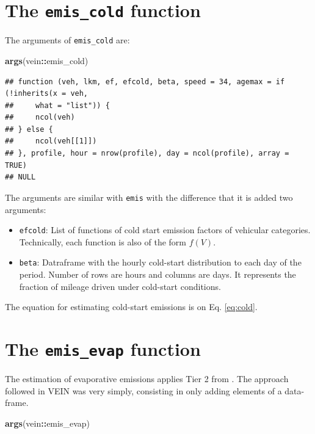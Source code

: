 \documentclass[12pt,graybox,envcountchap,sectrefs]{krantz}
\makeatletter
\newenvironment{Shaded}{\begin{snugshade}}{\end{snugshade}}
\newcommand{\KeywordTok}[1]{\textcolor[rgb]{0.13,0.29,0.53}{\textbf{#1}}}
\newcommand{\OperatorTok}[1]{\textcolor[rgb]{0.81,0.36,0.00}{\textbf{#1}}}
\newcommand{\NormalTok}[1]{#1}
\providecommand{\tightlist}{%
  \setlength{\itemsep}{0pt}\setlength{\parskip}{0pt}}
\newenvironment{kframe}{%
\medskip{}
\setlength{\fboxsep}{.8em}
 \def\at@end@of@kframe{}%
 \ifinner\ifhmode%
  \def\at@end@of@kframe{\end{minipage}}%
  \begin{minipage}{\columnwidth}%
 \fi\fi%
 \def\FrameCommand##1{\hskip\@totalleftmargin \hskip-\fboxsep
 \colorbox{shadecolor}{##1}\hskip-\fboxsep
     \hskip-\linewidth \hskip-\@totalleftmargin \hskip\columnwidth}%
 \MakeFramed {\advance\hsize-\width
   \@totalleftmargin\z@ \linewidth\hsize
   \@setminipage}}%
 {\par\unskip\endMakeFramed%
 \at@end@of@kframe}
\renewenvironment{Shaded}{\begin{kframe}}{\end{kframe}}
\theoremstyle{definition}
\theoremstyle{definition}
\theoremstyle{definition}
\theoremstyle{remark}
\makeatother
\begin{document}
\section{\texorpdfstring{The \texttt{emis\_cold}
function}{The emis\_cold function}}\label{the-emis_cold-function}

The arguments of \texttt{emis\_cold} are:

\begin{Shaded}
\begin{Highlighting}[]
\KeywordTok{args}\NormalTok{(vein}\OperatorTok{::}\NormalTok{emis_cold)}
\end{Highlighting}
\end{Shaded}

\begin{verbatim}
## function (veh, lkm, ef, efcold, beta, speed = 34, agemax = if (!inherits(x = veh, 
##     what = "list")) {
##     ncol(veh)
## } else {
##     ncol(veh[[1]])
## }, profile, hour = nrow(profile), day = ncol(profile), array = TRUE) 
## NULL
\end{verbatim}

The arguments are similar with \texttt{emis} with the difference that it
is added two arguments:

\begin{itemize}
\tightlist
\item
  \texttt{efcold}: List of functions of cold start emission factors of
  vehicular categories. Technically, each function is also of the form
  \(f(V)\).
\item
  \texttt{beta}: Datraframe with the hourly cold-start distribution to
  each day of the period. Number of rows are hours and columns are days.
  It represents the fraction of mileage driven under cold-start
  conditions.
\end{itemize}

The equation for estimating cold-start emissions is on Eq.
\eqref{eq:cold}.

\section{\texorpdfstring{The \texttt{emis\_evap}
function}{The emis\_evap function}}\label{the-emis_evap-function}

The estimation of evaporative emissions applies Tier 2 from
\citet{MelliosNtziachristos2016}. The approach followed in VEIN was very
simply, consisting in only adding elements of a data-frame.

\begin{Shaded}
\begin{Highlighting}[]
\KeywordTok{args}\NormalTok{(vein}\OperatorTok{::}\NormalTok{emis_evap)}
\end{Highlighting}
\end{Shaded}
\end{document}
